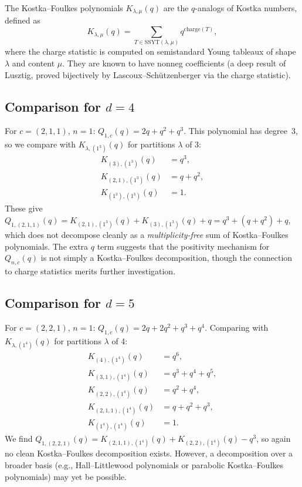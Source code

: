 \documentclass[11pt]{article}
\begin{document}
The Kostka--Foulkes polynomials $K_{\lambda,\mu}(q)$ are the $q$-analogs of
Kostka numbers, defined as
\[
  K_{\lambda,\mu}(q) = \sum_{T \in \mathrm{SSYT}(\lambda, \mu)} q^{\mathrm{charge}(T)},
\]
where the charge statistic is computed on semistandard Young tableaux of shape
$\lambda$ and content $\mu$. They are known to have nonneg coefficients (a deep
result of Lusztig, proved bijectively by Lascoux--Sch\"utzenberger via the charge
statistic).

\subsection{Comparison for $d = 4$}

For $c = (2,1,1)$, $n = 1$: $Q_{1,c}(q) = 2q + q^2 + q^3$. This polynomial has
degree~3, so we compare with $K_{\lambda,(1^3)}(q)$ for partitions $\lambda$ of 3:
\begin{align*}
  K_{(3),(1^3)}(q) &= q^3, \\
  K_{(2,1),(1^3)}(q) &= q + q^2, \\
  K_{(1^3),(1^3)}(q) &= 1.
\end{align*}
These give $Q_{1,(2,1,1)}(q) = K_{(2,1),(1^3)}(q) + K_{(3),(1^3)}(q) + q = q^3 + (q+q^2) + q$,
which does not decompose cleanly as a \emph{multiplicity-free} sum of Kostka--Foulkes polynomials.
The extra $q$ term suggests that the positivity mechanism for $Q_{n,c}(q)$ is not simply
a Kostka--Foulkes decomposition, though the connection to charge statistics merits further
investigation.

\subsection{Comparison for $d = 5$}

For $c = (2,2,1)$, $n = 1$: $Q_{1,c}(q) = 2q + 2q^2 + q^3 + q^4$. Comparing with
$K_{\lambda,(1^4)}(q)$ for partitions $\lambda$ of 4:
\begin{align*}
  K_{(4),(1^4)}(q) &= q^6, \\
  K_{(3,1),(1^4)}(q) &= q^3 + q^4 + q^5, \\
  K_{(2,2),(1^4)}(q) &= q^2 + q^4, \\
  K_{(2,1,1),(1^4)}(q) &= q + q^2 + q^3, \\
  K_{(1^4),(1^4)}(q) &= 1.
\end{align*}
We find $Q_{1,(2,2,1)}(q) = K_{(2,1,1),(1^4)}(q) + K_{(2,2),(1^4)}(q) - q^3$,
so again no clean Kostka--Foulkes decomposition exists. However, a decomposition
over a broader basis (e.g., Hall--Littlewood polynomials or parabolic
Kostka--Foulkes polynomials) may yet be possible.
\end{document}

